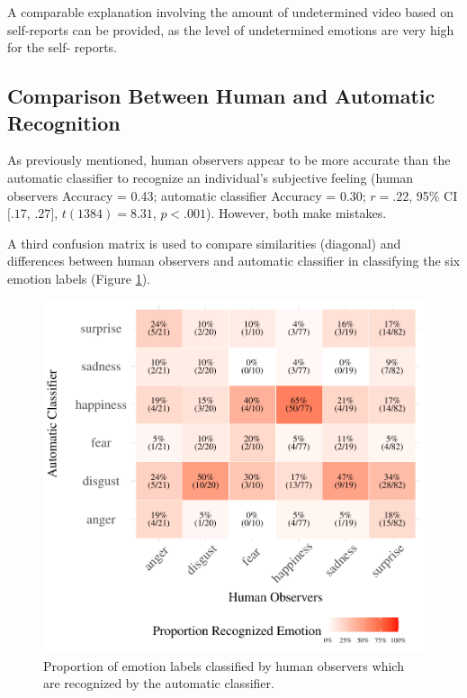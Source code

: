 \documentclass[
  english,
  doc]{apa7}
\begin{document}
A comparable explanation involving the amount of undetermined video based on self-reports can be provided, as the level of undetermined emotions are very high for the self- reports.

\hypertarget{comparison-between-human-and-automatic-recognition}{%
\subsection{Comparison Between Human and Automatic Recognition}\label{comparison-between-human-and-automatic-recognition}}

As previously mentioned, human observers appear to be more accurate than the automatic classifier to recognize an individual's subjective feeling (human observers Accuracy = 0.43; automatic classifier Accuracy = 0.30; \(r = .22\), 95\% CI \([.17\), \(.27]\), \(t(1384) = 8.31\), \(p < .001\)). However, both make mistakes.

A third confusion matrix is used to compare similarities (diagonal) and differences between human observers and automatic classifier in classifying the six emotion labels (Figure \ref{fig:confusionMatrix-hr-ar}).

\begin{figure}[!h]
\includegraphics[width=\textwidth]{manuscript_apa_files/figure-latex/confusionMatrix-hr-ar-1} \caption{Proportion of emotion labels classified by human observers which are recognized by the automatic classifier.}\label{fig:confusionMatrix-hr-ar}
\end{figure}
\end{document}
